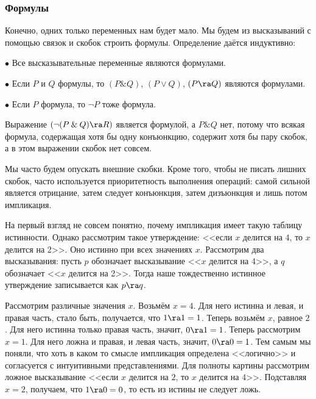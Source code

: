 \documentclass[a4paper,draft]{article}
\let\amper\&
\def\&{\mathbin{\amper}}
\begin{document}
\subsubsection{Формулы}

Конечно, одних только переменных нам будет мало. Мы будем из высказываний с помощью связок и скобок
строить формулы. Определение даётся индуктивно:

\begin{df}\par
  $\bullet$ Все высказывательные переменные являются формулами.\par
  $\bullet$ Если $P$ и $Q$ формулы, то $(P \& Q)$, $(P \vee Q)$, $(P \ra Q)$ являются
  формулами.\par
  $\bullet$ Если $P$ формула, то $\neg P$ тоже формула.
\end{df}

\begin{ex}
  Выражение $(\neg(P \& Q) \ra R)$ является формулой, а $P \& Q$ нет, потому что всякая формула, содержащая
  хотя бы одну конъюнкцию, содержит хотя бы пару скобок, а в этом выражении скобок нет совсем.
\end{ex}

\begin{note}
  Мы часто будем опускать внешние скобки. Кроме того, чтобы не писать лишних скобок,
  часто используется приоритетность выполнения операций: самой сильной является отрицание,
  затем следует конъюнкция, затем дизъюнкция и лишь потом импликация.
\end{note}

\begin{note}
  На первый взгляд не совсем понятно, почему импликация имеет такую таблицу истинности. Однако рассмотрим
  такое утверждение: <<если $x$ делится на $4$, то $x$ делится на $2$>>. Оно истинно при всех значениях $x$.
  Рассмотрим два высказывания: пусть $p$ обозначает высказывание <<$x$  делится на 4>>,
  а $q$ обозначает <<$x$ делится на 2>>. Тогда наше тождественно истинное утверждение
  записывается как $p \ra q$.

  Рассмотрим различные значения $x$. Возьмём $x = 4$. Для него истинна и левая, и правая часть,
  стало быть, получается, что $1 \ra 1 = 1$.  Теперь возьмём $x$, равное $2$.
  Для него истинна только правая часть, значит, $0 \ra 1 = 1$. Теперь рассмотрим $x =1$.
  Для него ложна и правая, и левая часть, значит, $0 \ra 0 = 1$. Тем самым мы поняли, что
  хоть в каком то смысле импликация определена <<логично>> и согласуется с интуитивными
  представлениями. Для полноты картины рассмотрим ложное высказывание
  <<если $x$ делится на $2$, то $x$ делится на $4$>>. Подставляя $x = 2$, получаем,
  что $1 \ra 0 = 0$, то есть из истины не следует ложь.
\end{note}
\end{document}

